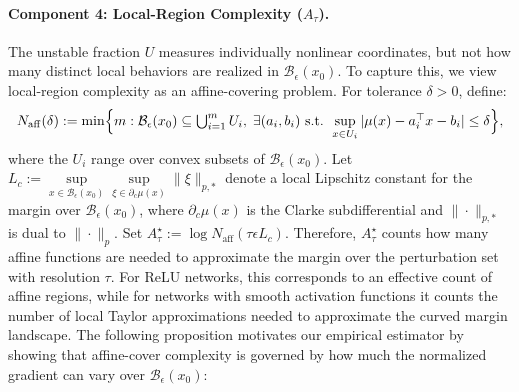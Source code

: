 \documentclass{article}
\theoremstyle{definition}
\begin{document}
\paragraph{Component 4: Local-Region Complexity ($A_\tau$).}
The unstable fraction $U$ measures individually nonlinear coordinates, but %
not how many distinct local behaviors are %
realized %
in $\mathcal B_\epsilon(x_0)$. To capture this, we view local-region complexity as an affine-covering problem. For tolerance $\delta>0$, define:
\begin{equation}\label{eq:Naff}
    N_{\mathrm{aff}}(\delta)
    :=
    \min\Bigl\{
    m:
    \mathcal B_\epsilon(x_0)\subseteq \textstyle\bigcup_{i=1}^m U_i,\;
    \exists (a_i,b_i)
    \text{ s.t. }
    \sup\limits_{x\in U_i}
    |\mu(x)-a_i^\top x-b_i|
    \leq \delta
    \Bigr\},
\end{equation}
where the $U_i$ range over convex subsets of $\mathcal B_\epsilon(x_0)$. Let $L_c:=\sup\limits_{x\in\mathcal B_\epsilon(x_0)}\sup\limits_{\xi\in\partial_c\mu(x)}\|\xi\|_{p,*}$ denote a local Lipschitz constant for the margin over $\mathcal B_\epsilon(x_0)$, where $\partial_c\mu(x)$ is the Clarke subdifferential and $\|\cdot\|_{p,*}$ is dual to $\|\cdot\|_p$. Set $A_\tau^\star:= \log N_{\mathrm{aff}}(\tau\epsilon L_c)$. Therefore, $A_\tau^\star$ counts how many affine functions are needed to approximate the  margin over the perturbation set with resolution $\tau$. For ReLU networks, this corresponds to an effective count of affine regions, while for networks with smooth activation functions it counts the number of local Taylor approximations needed to approximate the curved margin landscape. The following proposition motivates our empirical estimator by showing that affine-cover complexity is governed by how much the normalized gradient can vary over $\mathcal{B}_\epsilon(x_0)$:
\end{document}
